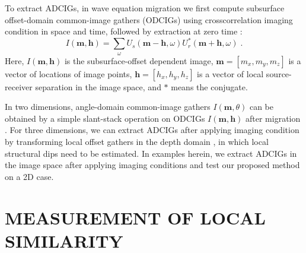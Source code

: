 To extract ADCIGs, in wave equation migration we first compute subsurface offset-domain common-image gathers (ODCIGs) using crosscorrelation imaging condition in space and time, followed by extraction at zero time \cite{Sava2006}:
\begin{equation}
  \label{eq:e1}
  I(\mathbf{m} ,\mathbf{h}) = \sum_\omega U_s(\mathbf{m} - \mathbf{h} ,\omega)
  U_r^\ast (\mathbf{m} + \mathbf{h} , \omega) \;.
\end{equation}
Here, \mbox{$I(\mathbf{m} , \mathbf{h})$} is the subsurface-offset dependent image, \mbox{$\mathbf{m} = \left[m_x,m_y,m_z\right]$} is a vector of locations of image points, $\mathbf{h} = \left[h_x,h_y,h_z\right]$ is a vector of local source-receiver separation in the image space, and $\ast$ means the conjugate.

In two dimensions, angle-domain common-image gathers $I(\mathbf{m} ,\theta)$ can be obtained by a simple slant-stack operation on ODCIGs $I(\mathbf{m} , \mathbf{h})$ after migration \cite[]{Stolt,Weglein,Sava2003}. For three dimensions, we can extract ADCIGs after applying imaging condition by transforming local offset gathers in the depth domain \cite[]{Fomel2004,Sava2005}, in which local structural dips need to be estimated. In examples herein, we extract ADCIGs in the image space after applying imaging conditions and test our proposed method on a 2D case.

\section{MEASUREMENT OF LOCAL SIMILARITY}

